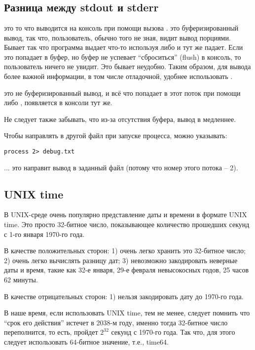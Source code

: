 ﻿\chapter{}

\section{Разница между stdout и stderr}

 это то что выводится на консоль при помощи вызова .
 это буферизированный вывод,
так что, пользователь, обычно того не зная, видит вывод порциями. Бывает так что программа выдает
что-то используя  либо  и тут же падает.
Если это попадает в буфер, но буфер не успевает
``сброситься'' (flush) в консоль, то пользователь ничего не увидит. Это бывает неудобно.
Таким образом, для вывода более важной информации, в том числе отладочной, удобнее использовать .

 это не буферизированный вывод, и всё что попадает в этот поток при помощи 
 либо , появляется в консоли тут же.

Не следует также забывать, что из-за отсутствия буфера, вывод в  медленнее.

Чтобы направлять  в другой файл при запуске процесса, можно указывать:

\begin{lstlisting}
process 2> debug.txt
\end{lstlisting}

... это направит вывод  в заданный файл (потому что номер этого потока -- 2).

\section{UNIX time}

В UNIX-среде очень популярно представление даты и времени в формате UNIX time.
Это просто 32-битное число, показывающее
количество прошедших секунд с 1-го января 1970-го года.

В качестве положительных сторон: 1) очень легко хранить это 32-битное число; 2) очень легко вычислять разницу дат;
3) невозможно закодировать неверные даты и время, такие как 32-е января, 29-е февраля невысокосных годов, 
25 часов 62 минуты.

В качестве отрицательных сторон: 1) нельзя закодировать дату до 1970-го года.

В наше время, если использовать UNIX time, тем не менее, следует помнить что ``срок его действия'' истечет
в 2038-м году, именно тогда 32-битное число переполнится, то есть, пройдет $2^{32}$ секунд с 1970-го года.
Так что, для этого следует использовать 64-битное значение, т.е., time64.


